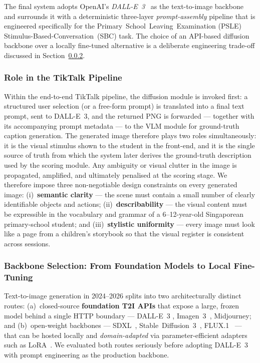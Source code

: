 \documentclass{article}
\begin{document}
The final system adopts OpenAI's
\textit{DALL-E~3}~\cite{betker2023dalle3} as the text-to-image backbone
and surrounds it with a deterministic three-layer
\textit{prompt-assembly} pipeline that is engineered specifically for
the Primary~School~Leaving~Examination (PSLE)
Stimulus-Based-Conversation~(SBC) task. The choice of an API-based
diffusion backbone over a locally fine-tuned alternative is a
deliberate engineering trade-off discussed in
Section~\ref{sec:diffusion-backbone}.

\subsubsection{Role in the TikTalk Pipeline}
\label{sec:diffusion-role}

Within the end-to-end TikTalk pipeline, the diffusion
module is invoked first: a structured user selection (or a free-form
prompt) is translated into a final text prompt, sent to DALL-E~3, and
the returned PNG is forwarded — together with its accompanying prompt
metadata — to the VLM module for ground-truth caption generation. The
generated image therefore plays two roles simultaneously: it is the
visual stimulus shown to the student in the front-end, and it is the
single source of truth from which the system later derives the
ground-truth description used by the scoring module. Any ambiguity or
visual clutter in the image is propagated, amplified, and ultimately
penalised at the scoring stage. We therefore impose three
non-negotiable design constraints on every generated image:
(i)~\textbf{semantic clarity} — the scene must contain a small number of
clearly identifiable objects and actions; (ii)~\textbf{describability} —
the visual content must be expressible in the vocabulary and grammar of
a 6--12-year-old Singaporean primary-school student; and
(iii)~\textbf{stylistic uniformity} — every image must look like a page
from a children's storybook so that the visual register is consistent
across sessions.

\subsubsection{Backbone Selection: From Foundation Models to Local
Fine-Tuning}
\label{sec:diffusion-backbone}

Text-to-image generation in 2024--2026 splits into two architecturally
distinct routes: (a)~closed-source \textbf{foundation T2I APIs} that
expose a large, frozen model behind a single HTTP boundary --- DALL-E~3
\cite{betker2023dalle3}, Imagen~3~\cite{imagenteam2024imagen3}, Midjourney;
and (b)~open-weight backbones --- SDXL~\cite{podell2023sdxl},
Stable~Diffusion~3~\cite{esser2024sd3}, FLUX.1~\cite{bfl2024flux} ---
that can be hosted locally and \textit{domain-adapted} via
parameter-efficient adapters such as LoRA~\cite{hu2022lora}. We
evaluated both routes seriously before adopting DALL-E~3 with prompt
engineering as the production backbone.
\end{document}
